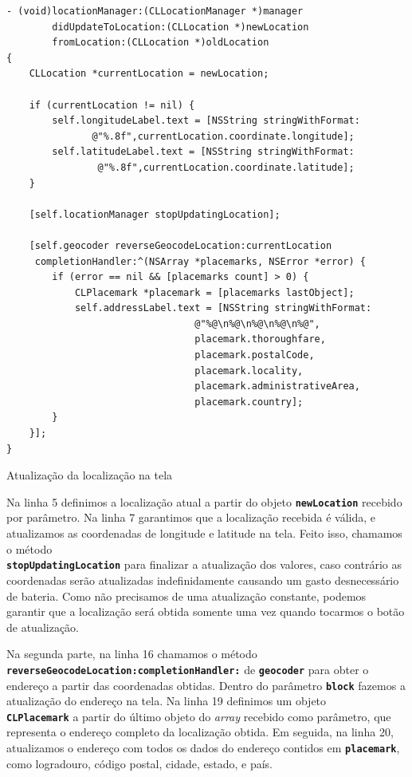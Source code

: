 \documentclass[a4paper,12pt,brazil,doubleside]{book}
\begin{document}
\begin{singlespace}
\begin{listing}[H]
\begin{verbatim}
- (void)locationManager:(CLLocationManager *)manager
        didUpdateToLocation:(CLLocation *)newLocation
        fromLocation:(CLLocation *)oldLocation
{
    CLLocation *currentLocation = newLocation;
    
    if (currentLocation != nil) {
        self.longitudeLabel.text = [NSString stringWithFormat:
               @"%.8f",currentLocation.coordinate.longitude];
        self.latitudeLabel.text = [NSString stringWithFormat:
                @"%.8f",currentLocation.coordinate.latitude];
    }
    
    [self.locationManager stopUpdatingLocation];
    
    [self.geocoder reverseGeocodeLocation:currentLocation
     completionHandler:^(NSArray *placemarks, NSError *error) {
        if (error == nil && [placemarks count] > 0) {
            CLPlacemark *placemark = [placemarks lastObject];
            self.addressLabel.text = [NSString stringWithFormat:
                                 @"%@\n%@\n%@\n%@\n%@",
                                 placemark.thoroughfare,
                                 placemark.postalCode,
                                 placemark.locality,
                                 placemark.administrativeArea,
                                 placemark.country];
        }
    }];
}
\end{verbatim}
\caption{Atualização da localização na tela}
\end{listing}


Na linha 5 definimos a localização atual a partir do objeto \texttt{\textbf{newLocation}} recebido por parâmetro. Na linha 7 garantimos que a localização recebida é válida, e atualizamos as coordenadas de longitude e latitude na tela. Feito isso, chamamos o método\\ \texttt{\textbf{stopUpdatingLocation}} para finalizar a atualização dos valores, caso contrário as coordenadas serão atualizadas indefinidamente causando um gasto desnecessário de bateria. Como não precisamos de uma atualização constante, podemos garantir que a localização será obtida somente uma vez quando tocarmos o botão de atualização.

Na segunda parte, na linha 16 chamamos o método\\ \texttt{\textbf{reverseGeocodeLocation:completionHandler:}} de \texttt{\textbf{geocoder}} para obter o endereço a partir das coordenadas obtidas. Dentro do parâmetro \texttt{\textbf{block}} fazemos a atualização do endereço na tela. Na linha 19 definimos um objeto\\ \texttt{\textbf{CLPlacemark}} a partir do último objeto do \emph{array} recebido como parâmetro, que representa o endereço completo da localização obtida. Em seguida, na linha 20, atualizamos o endereço com todos os dados do endereço contidos em \texttt{\textbf{placemark}}, como logradouro, código postal, cidade, estado, e país.


\end{singlespace}
\end{document}

